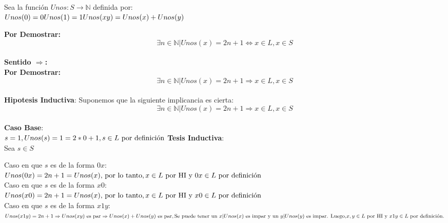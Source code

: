 \documentclass[12pt]{article}
\begin{document}
Sea la función $Unos: S \rightarrow \mathbb{N}$ definida por: \\
\begin{math}
Unos(0) = 0 \\
Unos(1) = 1 \\
Unos(xy) = Unos(x) + Unos(y)\\
\end{math}

\textbf{Por Demostrar:}\\
\[\exists n \in \mathbb{N} | Unos(x) = 2n + 1 \Leftrightarrow x \in L, x \in S\] \\

\textbf{Sentido $\Rightarrow$:}\\

\textbf{Por Demostrar:}\\
\[\exists n \in \mathbb{N} | Unos(x) = 2n + 1 \Rightarrow x \in L, x \in S\] \\


\textbf{Hipotesis Inductiva}: Suponemos que la siguiente implicancia es cierta:
\[\exists n \in \mathbb{N} | Unos(x) = 2n + 1 \Rightarrow x \in L, x \in S\] \\
\textbf{Caso Base}:\\
\begin{math}
s = 1, Unos(s) = 1 = 2*0 + 1, s \in L \textrm{ por definición}\\ \\
\end{math}
\textbf{Tesis Inductiva}:\\
Sea $s \in S$

Caso en que $s$ es de la forma $0x$:\\
\begin{math}
Unos(0x) = 2n + 1 = Unos(x) \textrm{, por lo tanto}, \\
x \in L \textrm{ por HI y } 0x \in L \textrm{ por definición}\\
\end{math} \\

Caso en que $s$ es de la forma $x0$:\\
\begin{math}
Unos(x0) = 2n + 1 = Unos(x) \textrm{, por lo tanto}, \\
x \in L \textrm{ por HI y } x0 \in L \textrm{ por definición}\\
\end{math} \\

Caso en que $s$ es de la forma $x1y$:\\
\begin{math}
Unos(x1y) = 2n + 1 \Rightarrow Unos(xy) \textrm{ es par} \Rightarrow Unos(x) + Unos(y)\textrm{ es par}, \\
\textrm{Se puede tener un } x | Unos(x) \textrm{ es impar y un } y | Unos(y) \textrm{ es impar. Luego,} \\
x,y \in L \textrm{ por HI y } x1y \in L \textrm{ por definición}. 
\end{math} \\
\end{document}
